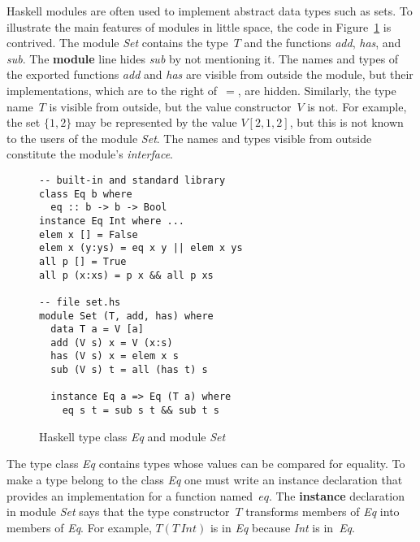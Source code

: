 \documentclass[a4paper,12pt,oneside,fleqn]{book} %
\theoremstyle{plain}
\theoremstyle{definition}
\theoremstyle{remark}
\begin{document}

Haskell modules are often used to implement abstract data types such as
sets.  To illustrate the main features of modules in little space, the code
in Figure~\ref{fig:haskell} is contrived.  The module \textit{Set} contains
the type~$T$ and the functions \textit{add}, \textit{has}, and
\textit{sub}. The \textbf{module} line hides \textit{sub} by not mentioning
it. The names and types of the exported functions \textit{add} and
\textit{has} are visible from outside the module, but their
implementations, which are to the right of~$=$, are hidden.  Similarly, the
type name~$T$ is visible from outside, but the value constructor~$V$ is
not. For example, the set $\{1,2\}$ may be represented by the value
$V[2,1,2]$, but this is not known to the users of the module \textit{Set}.
The names and types visible from outside constitute the module's
\emph{interface}.

\begin{figure}\footnotesize %
\begin{verbatim}
-- built-in and standard library
class Eq b where
  eq :: b -> b -> Bool
instance Eq Int where ...
elem x [] = False
elem x (y:ys) = eq x y || elem x ys
all p [] = True
all p (x:xs) = p x && all p xs

-- file set.hs
module Set (T, add, has) where
  data T a = V [a]
  add (V s) x = V (x:s)
  has (V s) x = elem x s
  sub (V s) t = all (has t) s

  instance Eq a => Eq (T a) where
    eq s t = sub s t && sub t s
\end{verbatim}
\caption{Haskell type class \textit{Eq} and module \textit{Set}}
\label{fig:haskell}
\end{figure} %


The type class \textit{Eq} contains types whose values can be compared for
equality. To make a type belong to the class \textit{Eq} one must write an
instance declaration that provides an implementation for a function
named~$eq$. The \textbf{instance} declaration in module \textit{Set} says
that the type constructor~$T$ transforms members of \textit{Eq} into
members of \textit{Eq}. For example, $T(T\,\mathit{Int})$ is in \textit{Eq}
because \textit{Int} is in~\textit{Eq}.
\end{document}
